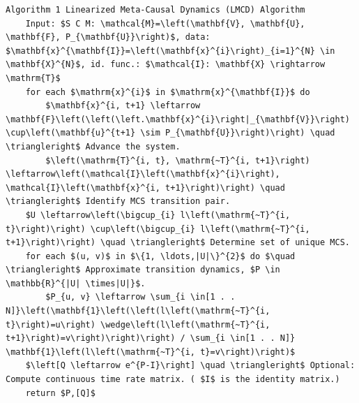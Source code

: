 \documentclass[10pt]{article}
\begin{document}
\begin{verbatim}
Algorithm 1 Linearized Meta-Causal Dynamics (LMCD) Algorithm
    Input: $S C M: \mathcal{M}=\left(\mathbf{V}, \mathbf{U}, \mathbf{F}, P_{\mathbf{U}}\right)$, data: $\mathbf{x}^{\mathbf{I}}=\left(\mathbf{x}^{i}\right)_{i=1}^{N} \in \mathbf{X}^{N}$, id. func.: $\mathcal{I}: \mathbf{X} \rightarrow \mathrm{T}$
    for each $\mathrm{x}^{i}$ in $\mathrm{x}^{\mathbf{I}}$ do
        $\mathbf{x}^{i, t+1} \leftarrow \mathbf{F}\left(\left(\left.\mathbf{x}^{i}\right|_{\mathbf{V}}\right) \cup\left(\mathbf{u}^{t+1} \sim P_{\mathbf{U}}\right)\right) \quad \triangleright$ Advance the system.
        $\left(\mathrm{T}^{i, t}, \mathrm{~T}^{i, t+1}\right) \leftarrow\left(\mathcal{I}\left(\mathbf{x}^{i}\right), \mathcal{I}\left(\mathbf{x}^{i, t+1}\right)\right) \quad \triangleright$ Identify MCS transition pair.
    $U \leftarrow\left(\bigcup_{i} l\left(\mathrm{~T}^{i, t}\right)\right) \cup\left(\bigcup_{i} l\left(\mathrm{~T}^{i, t+1}\right)\right) \quad \triangleright$ Determine set of unique MCS.
    for each $(u, v)$ in $\{1, \ldots,|U|\}^{2}$ do $\quad \triangleright$ Approximate transition dynamics, $P \in \mathbb{R}^{|U| \times|U|}$.
        $P_{u, v} \leftarrow \sum_{i \in[1 . . N]}\left(\mathbf{1}\left(\left(l\left(\mathrm{~T}^{i, t}\right)=u\right) \wedge\left(l\left(\mathrm{~T}^{i, t+1}\right)=v\right)\right)\right) / \sum_{i \in[1 . . N]} \mathbf{1}\left(l\left(\mathrm{~T}^{i, t}=v\right)\right)$
    $\left[Q \leftarrow e^{P-I}\right] \quad \triangleright$ Optional: Compute continuous time rate matrix. ( $I$ is the identity matrix.)
    return $P,[Q]$
\end{verbatim}
\end{document}
